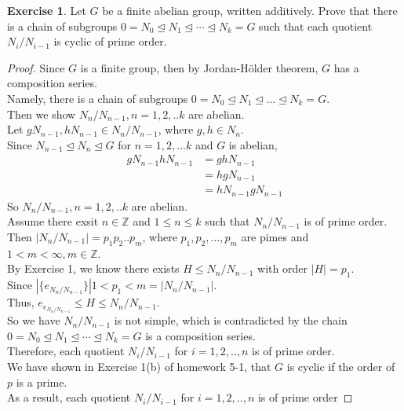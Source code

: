 \documentclass{amsart}
\newcommand{\bbz}{\mathbb{Z}}
\theoremstyle{plain}
\theoremstyle{definition}
\newtheorem{exer}[lem]{Exercise}
\begin{document}
\begin{exer}
Let $G$ be a finite abelian group, written additively.
Prove that there is a chain of subgroups $0=N_0\unlhd N_1\unlhd\cdots\unlhd N_k=G$ such that each quotient $N_i/N_{i-1}$ is cyclic of prime order.
\begin{proof}
	Since $G$ is a finite group, then by Jordan-H\"{o}lder theorem, $G$ has a composition series.\\
	Namely, there is a chain of subgroups $0= N_0 \unlhd N_1 \unlhd...\unlhd N_k = G$.\\
	Then we show $N_n/N_{n-1}, n = 1,2,..k$ are abelian. \\
  	Let $gN_{n-1}, hN_{n-1} \in N_n/N_{n-1}$, where $g,h \in N_n$.\\
  	Since $N_{n-1} \unlhd N_{n} \unlhd G$ for $n = 1,2,...k$ and $G$ is abelian,\\
  	\begin{align*}
  	  gN_{n-1}hN_{n-1} &= ghN_{n-1} \\
  	  				&= hgN_{n-1}\\
  	  				&=hN_{n-1}gN_{n-1}
  	\end{align*}
  	So $N_n/N_{n-1}, n = 1,2,..k$ are abelian.\\
	Assume there exsit $n \in \bbz$ and $1 \leq n \leq k$ such that $N_n/N_{n-1}$ is of prime order.\\
	Then $|N_n/N_{n-1}| = p_1p_2..p_m$, where $p_1,p_2,...,p_m$ are pimes and $ 1< m < \infty, m \in \bbz$.\\
	By Exercise 1, we know there exists $H \leq N_n/N_{n-1}$ with order $|H|=p_1$. \\
	Since $|\{e_{N_n/N_{n-1}}\}|1 < p_1 < m = |N_n/N_{n-1}|$.\\
	Thus, ${e_{e_{N_n/N_{n-1}}}} \leq H \leq N_n/N_{n-1}$.\\ 
	So we have $N_n/N_{n-1}$ is not simple, which is contradicted by the chain $0=N_0\unlhd N_1\unlhd\cdots\unlhd N_k=G$ is a composition series.\\
	Therefore, each quotient $N_i/N_{i-1}$ for $i=1,2,..,n$ is of prime order.\\
	We have shown in Exercise 1(b) of homework 5-1, that $G$ is cyclic if the order of $p$ is a prime.\\
	As a result, each quotient $N_i/N_{i-1}$ for $i=1,2,..,n$ is of prime order
 \end{proof}
\end{exer}
\end{document}
